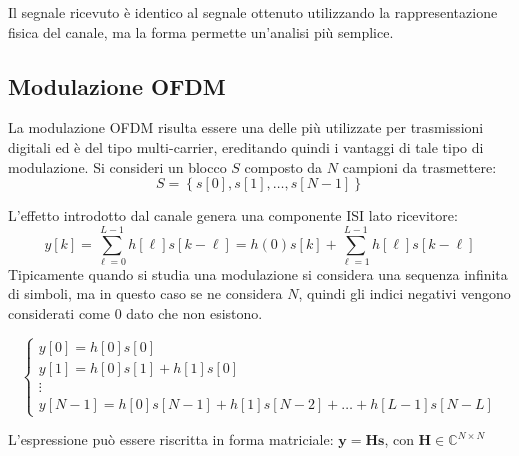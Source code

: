 Il segnale ricevuto è identico al segnale ottenuto utilizzando la rappresentazione fisica del canale, ma la forma permette un'analisi più semplice.


\subsection*{Modulazione OFDM}

La modulazione OFDM risulta essere una delle più utilizzate per trasmissioni digitali ed è del tipo multi-carrier, ereditando quindi i vantaggi di tale tipo di modulazione.
Si consideri un blocco $S$ composto da $N$ campioni da trasmettere:
\[
  S = \left\{s\left[0\right], s\left[1\right], \ldots, s\left[N-1\right]\right\}
\]

L'effetto introdotto dal canale genera una componente ISI lato ricevitore:
\[
  y\left[k\right] = \sum_{\ell=0}^{L-1} h\left[\ell\right] s\left[k - \ell\right] = h(0)s\left[k\right] + \sum_{\ell=1}^{L-1} h\left[\ell\right] s\left[k - \ell\right]
\]
Tipicamente quando si studia una modulazione si considera una sequenza infinita di simboli, ma in questo caso se ne considera $N$, quindi gli indici negativi vengono considerati come 0 dato che non esistono.


\[
    \begin{cases}
        y[0] = h[0]s[0] \\
        y[1] = h[0]s[1] + h[1]s[0] \\
        \vdots \\
        y[N-1] = h[0]s[N-1] + h[1]s[N-2] + \ldots + h[L-1]s[N-L]
    \end{cases}
\]



L'espressione può essere riscritta in forma matriciale: $\mathbf{y} = \mathbf{H} \mathbf{s}$, con $\mathbf{H} \in \mathbb{C}^{N \times N}$ 

